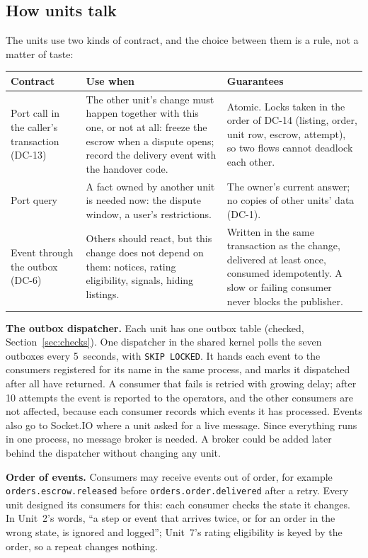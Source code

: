 \documentclass[11pt,a4paper]{article}
\newenvironment{dtable}[1]{\small\begin{longtable}{#1}}{\end{longtable}}
\begin{document}
\subsection{How units talk}
\label{sec:talk}
The units use two kinds of contract, and the choice between them is a rule, not a matter of taste:
\begin{dtable}{@{}>{\raggedright\arraybackslash}p{2.8cm}>{\raggedright\arraybackslash}p{6.0cm}>{\raggedright\arraybackslash}p{6.4cm}@{}}
\toprule
\textbf{Contract} & \textbf{Use when} & \textbf{Guarantees} \\ \midrule \endhead
Port call in the caller's transaction (DC-13) & The other unit's change must happen together with this one, or not at all: freeze the escrow when a dispute opens; record the delivery event with the handover code. & Atomic. Locks taken in the order of DC-14 (listing, order, unit row, escrow, attempt), so two flows cannot deadlock each other. \\
Port query & A fact owned by another unit is needed now: the dispute window, a user's restrictions. & The owner's current answer; no copies of other units' data (DC-1). \\
Event through the outbox (DC-6) & Others should react, but this change does not depend on them: notices, rating eligibility, signals, hiding listings. & Written in the same transaction as the change, delivered at least once, consumed idempotently. A slow or failing consumer never blocks the publisher. \\
\bottomrule
\end{dtable}

\textbf{The outbox dispatcher.} Each unit has one outbox table (checked, Section~\ref{sec:checks}). One dispatcher in the shared kernel polls the seven outboxes every 5~seconds, with \texttt{SKIP LOCKED}. It hands each event to the consumers registered for its name in the same process, and marks it dispatched after all have returned. A consumer that fails is retried with growing delay; after 10 attempts the event is reported to the operators, and the other consumers are not affected, because each consumer records which events it has processed. Events also go to Socket.IO where a unit asked for a live message. Since everything runs in one process, no message broker is needed. A broker could be added later behind the dispatcher without changing any unit.

\textbf{Order of events.} Consumers may receive events out of order, for example \texttt{orders.\allowbreak escrow.\allowbreak released} before \texttt{orders.\allowbreak order.\allowbreak delivered} after a retry. Every unit designed its consumers for this: each consumer checks the state it changes. In Unit~2's words, ``a step or event that arrives twice, or for an order in the wrong state, is ignored and logged''; Unit~7's rating eligibility is keyed by the order, so a repeat changes nothing.
\end{document}
